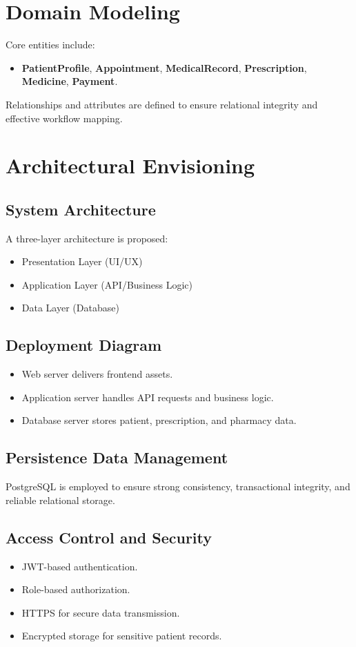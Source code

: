 \documentclass[12pt,a4paper]{report}
\begin{document}
\section{Domain Modeling}
Core entities include:
\begin{itemize}
    \item \textbf{PatientProfile}, \textbf{Appointment}, \textbf{MedicalRecord}, \textbf{Prescription}, \textbf{Medicine}, \textbf{Payment}.
\end{itemize}
Relationships and attributes are defined to ensure relational integrity and effective workflow mapping.

\section{Architectural Envisioning}
\subsection{System Architecture}
A three-layer architecture is proposed:
\begin{itemize}
    \item Presentation Layer (UI/UX)
    \item Application Layer (API/Business Logic)
    \item Data Layer (Database)
\end{itemize}

\subsection{Deployment Diagram}
\begin{itemize}
    \item Web server delivers frontend assets.
    \item Application server handles API requests and business logic.
    \item Database server stores patient, prescription, and pharmacy data.
\end{itemize}

\subsection{Persistence Data Management}
PostgreSQL is employed to ensure strong consistency, transactional integrity, and reliable relational storage.

\subsection{Access Control and Security}
\begin{itemize}
    \item JWT-based authentication.
    \item Role-based authorization.
    \item HTTPS for secure data transmission.
    \item Encrypted storage for sensitive patient records.
\end{itemize}
\end{document}
